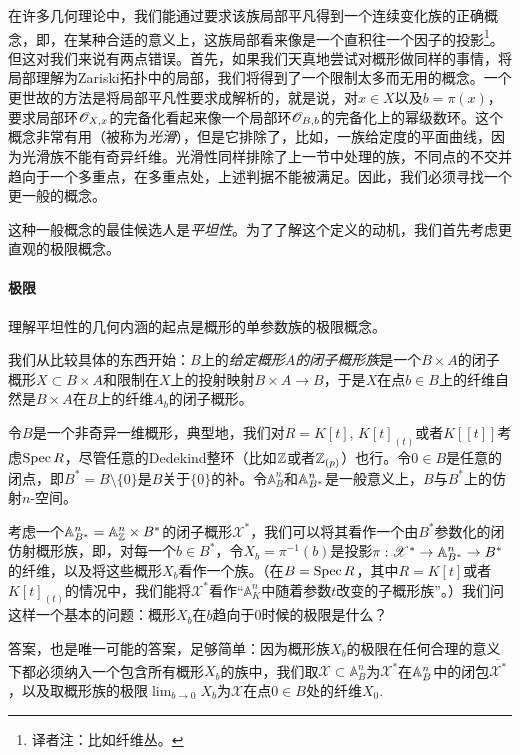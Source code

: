 在许多几何理论中，我们能通过要求该族局部平凡得到一个连续变化族的正确概念，即，在某种合适的意义上，这族局部看来像是一个直积往一个因子的投影\footnote{译者注：比如纤维丛。}。但这对我们来说有两点错误。首先，如果我们天真地尝试对概形做同样的事情，将局部理解为Zariski拓扑中的局部，我们将得到了一个限制太多而无用的概念。一个更世故的方法是将局部平凡性要求成解析的，就是说，对$x\in X$以及$b=\pi(x)$，要求局部环$\mathscr{O}_{X,x}$的完备化看起来像一个局部环$\mathscr{O}_{B,b}$的完备化上的幂级数环。这个概念非常有用（被称为\textit{光滑}），但是它排除了，比如，一族给定度的平面曲线，因为光滑族不能有奇异纤维。光滑性同样排除了上一节中处理的族，不同点的不交并趋向于一个多重点，在多重点处，上述判据不能被满足。因此，我们必须寻找一个更一般的概念。

这种一般概念的最佳候选人是\textit{平坦性}。为了了解这个定义的动机，我们首先考虑更直观的极限概念。

\paragraph*{极限}
理解平坦性的几何内涵的起点是概形的单参数族的极限概念。

我们从比较具体的东西开始：$B$上的\textit{给定概形$A$的闭子概形族}是一个$B\times A$的闭子概形$X\subset B\times A$和限制在$X$上的投射映射$B\times A\to B$，于是$X$在点$b\in B$上的纤维自然是$B\times A$在$B$上的纤维$A_b$的闭子概形。

令$B$是一个非奇异一维概形，典型地，我们对$R=K[t]$, $K[t]_{(t)}$或者$K[\![t]\!]$考虑$\operatorname{Spec} R$，尽管任意的Dedekind整环（比如$\mathbb{Z}$或者$\mathbb{Z}_{(p)}$）也行。令$0\in B$是任意的闭点，即$B^*=B\setminus \{0\}$是$B$关于$\{0\}$的补。令$\mathbb{A}_B^n$和$\mathbb{A}_{B^*}^n$是一般意义上，$B$与$B^*$上的仿射$n$-空间。

考虑一个$\mathbb{A}_{B^*}^n=\mathbb{A}_{\mathbb{Z}}^n\times B^*$的闭子概形$\mathscr{X}^*$，我们可以将其看作一个由$B^*$参数化的闭仿射概形族，即，对每一个$b\in B^*$，令$X_b=\pi^{-1}(b)$是投影$\pi:\mathscr{X}^*\to \mathbb{A}_{B^*}^n\to B^*$的纤维，以及将这些概形$X_b$看作一个族。（在$B=\operatorname{Spec} R$，其中$R=K[t]$或者$K[t]_{(t)}$的情况中，我们能将$\mathscr{X}^*$看作“$\mathbb{A}_K^n$中随着参数$t$改变的子概形族”。）我们问这样一个基本的问题：概形$X_b$在$b$趋向于$0$时候的极限是什么？


答案，也是唯一可能的答案，足够简单：因为概形族$X_b$的极限在任何合理的意义下都必须纳入一个包含所有概形$X_b$的族中，我们取$\mathscr{X}\subset \mathbb{A}_B^n$为$\mathscr{X}^*$在$\mathbb{A}_B^n$中的闭包$\overline{\mathscr{X}^*}$，以及取概形族的极限$\lim_{b\to 0}X_b$为$\mathscr{X}$在点$0\in B$处的纤维$X_0$.

